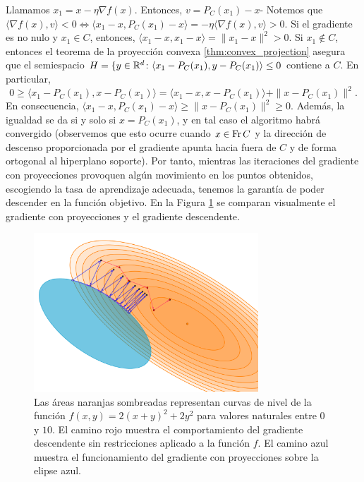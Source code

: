 Llamamos $x_1 = x - \eta\nabla f(x)$. Entonces, $v = P_C(x_1) - x$- Notemos que $\langle \nabla f(x), v \rangle < 0 \iff \langle x_1 - x, P_C(x_1) - x \rangle = -\eta \langle \nabla f(x), v \rangle > 0$. Si el gradiente es no nulo y $x_1 \in C$, entonces, $\langle x_1 - x, x_1 - x \rangle = \|x_1 - x \|^2 > 0$. Si $x_1 \notin C$, entonces el teorema de la proyección convexa \ref{thm:convex_projection} asegura que el semiespacio $H = \{y \in \mathbb{R}^d \colon \langle x_1 - P_C(x_1), y - P_C(x_1) \rangle \le 0$ contiene a $C$. En particular,
\[ 0 \ge \langle x_1 - P_C(x_1), x - P_C(x_1) \rangle = \langle x_1 - x, x - P_C(x_1) \rangle + \|x - P_C(x_1)\|^2.  \]
En consecuencia, $ \langle x_1 - x, P_C(x_1) - x \rangle \ge \|x - P_C(x_1)\|^2 \ge 0$. Además, la igualdad se da si y solo si $x = P_C(x_1)$, y en tal caso el algoritmo habrá convergido (observemos que esto ocurre cuando $x \in \operatorname{Fr} C$ y la dirección de descenso proporcionada por el gradiente apunta hacia fuera de $C$ y de forma ortogonal al hiperplano soporte). Por tanto, mientras las iteraciones del gradiente con proyecciones provoquen algún movimiento en los puntos obtenidos, escogiendo la tasa de aprendizaje adecuada, tenemos la garantía de poder descender en la función objetivo. En la Figura \ref{fig:gradient} se comparan visualmente el gradiente con proyecciones y el gradiente descendente.

\begin{figure}[h]
    \centering
    \includegraphics[width=0.75\textwidth]{./images/gradient.png}
    \caption{Las áreas naranjas sombreadas representan curvas de nivel de la función $f(x,y) = 2(x+y)^2 + 2y^2$ para valores naturales entre $0$ y $10$. El camino rojo muestra el comportamiento del gradiente descendente sin restricciones aplicado a la función $f$. El camino azul muestra el funcionamiento del gradiente con proyecciones sobre la elipse azul.} \label{fig:gradient}
\end{figure}

